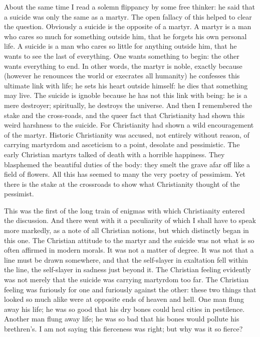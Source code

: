 About the same time I read a solemn flippancy by some free thinker: he said that a suicide was only the same as a martyr. The open fallacy of this helped to clear the question. Obviously a suicide is the opposite of a martyr. A martyr is a man who cares so much for something outside him, that he forgets his own personal life. A suicide is a man who cares so little for anything outside him, that he wants to see the last of everything. One wants something to begin: the other wants everything to end. In other words, the martyr is noble, exactly because (however he renounces the world or execrates all humanity) he confesses this ultimate link with life; he sets his heart outside himself: he dies that something may live. The suicide is ignoble because he has not this link with being: he is a mere destroyer; spiritually, he destroys the universe. And then I remembered the stake and the cross-roads, and the queer fact that Christianity had shown this weird harshness to the suicide. For Christianity had shown a wild encouragement of the martyr. Historic Christianity was accused, not entirely without reason, of carrying martyrdom and asceticism to a point, desolate and pessimistic. The early Christian martyrs talked of death with a horrible happiness. They blasphemed the beautiful duties of the body: they smelt the grave afar off like a field of flowers. All this has seemed to many the very poetry of pessimism. Yet there is the stake at the crossroads to show what Christianity thought of the pessimist.

This was the first of the long train of enigmas with which Christianity entered the discussion. And there went with it a peculiarity of which I shall have to speak more markedly, as a note of all Christian notions, but which distinctly began in this one. The Christian attitude to the martyr and the suicide was not what is so often affirmed in modern morals. It was not a matter of degree. It was not that a line must be drawn somewhere, and that the self-slayer in exaltation fell within the line, the self-slayer in sadness just beyond it. The Christian feeling evidently was not merely that the suicide was carrying martyrdom too far. The Christian feeling was furiously for one and furiously against the other: these two things that looked so much alike were at opposite ends of heaven and hell. One man flung away his life; he was so good that his dry bones could heal cities in pestilence. Another man flung away life; he was so bad that his bones would pollute his brethren’s. I am not saying this fierceness was right; but why was it so fierce?

